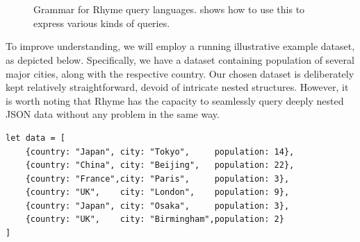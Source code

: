 \documentclass[runningheads]{llncs}
\newcommand{\lang}{Rhyme}
\begin{document}
\begin{figure}[t!]
\scriptsize
\begin{bnf*}
\\
 \\
 \\
 \\
 \\
 \\
 \\
\end{bnf*}
\caption{Grammar for \lang{} query languages.  shows how to use this to express
various kinds of queries.}\label{fig:grammar}
\end{figure}



To improve understanding, we will employ a running illustrative example dataset, as
depicted below.
Specifically, we have a dataset containing population of several major cities,
along with the respective country.
Our chosen dataset is deliberately kept relatively straightforward, devoid of
intricate nested structures.
However, it is worth noting that \lang{} has the capacity to seamlessly query
deeply nested JSON data without any problem in the same way.

\begin{lstlisting}[style=JavaScript]
let data = [
    {country: "Japan", city: "Tokyo",     population: 14},
    {country: "China", city: "Beijing",   population: 22},
    {country: "France",city: "Paris",     population: 3},
    {country: "UK",    city: "London",    population: 9},
    {country: "Japan", city: "Osaka",     population: 3},
    {country: "UK",    city: "Birmingham",population: 2}
]
\end{lstlisting}
\end{document}
